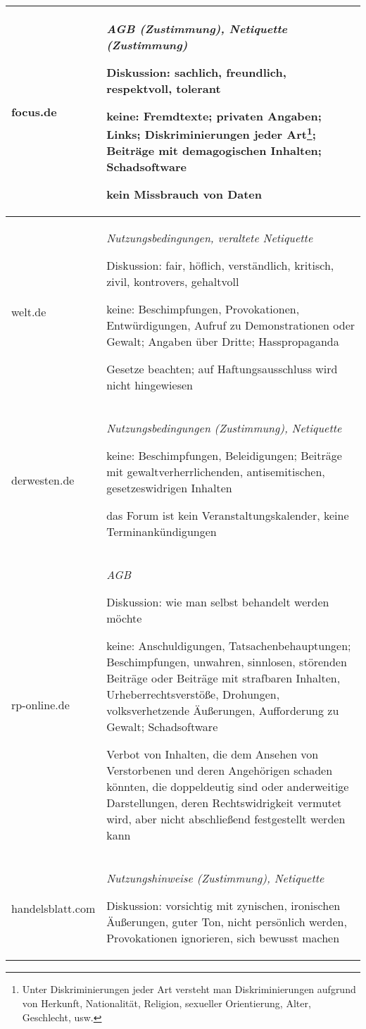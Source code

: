 \begin{landscape}
\begin{longtable}{lp{170mm}}
focus.de & \emph{AGB (Zustimmung), Netiquette (Zustimmung)}
	
	Diskussion: sachlich, freundlich, respektvoll, tolerant
	
	keine: Fremdtexte; privaten Angaben; Links; Diskriminierungen jeder Art\footnote{Unter Diskriminierungen jeder Art versteht man Diskriminierungen  
	aufgrund von Herkunft, Nationalität, Religion, sexueller Orientierung, Alter,
	Geschlecht, usw.}; Beiträge mit  demagogischen Inhalten; Schadsoftware
	
	kein Missbrauch von Daten
	\tabularnewline\midrule

welt.de & \emph{Nutzungsbedingungen, veraltete Netiquette}

	Diskussion: fair, höflich, verständlich, kritisch, zivil, kontrovers, gehaltvoll
		
	keine: Be\-schim\-pfung\-en, Pro\-vo\-ka\-tio\-nen, Ent\-wür\-di\-gung\-en, Auf\-ruf zu Demonstrationen oder Gewalt; Angaben über Dritte; 					Hasspropaganda 
	
	Gesetze beachten; auf Haftungsausschluss wird nicht hingewiesen\tabularnewline\midrule

derwesten.de & \emph{Nutzungsbedingungen (Zustimmung), Netiquette}

	keine: Beschimpfungen, Beleidigungen; Beiträge mit gewaltverherrlichenden, antisemitischen, gesetzeswidrigen Inhalten

	das Forum ist kein Ver\-an\-stal\-tungs\-ka\-len\-der, keine Ter\-min\-an\-kün\-di\-gun\-gen
	\tabularnewline\midrule


rp-online.de & \emph{AGB}

	Diskussion: wie man selbst behandelt werden möchte
	
	keine: Anschuldigungen, Tatsachenbehauptungen; Beschimpfungen, unwahren, sinnlosen, störenden Beiträge oder Beiträge mit strafbaren Inhalten, Urheberrechtsverstöße, Drohungen, volksverhetzende Äußerungen, Aufforderung zu Gewalt; Schadsoftware
	
	Verbot von Inhalten, die dem Ansehen von Verstorbenen und deren Angehörigen schaden könnten, die doppeldeutig
	sind oder anderweitige Darstellungen, deren Rechtswidrigkeit vermutet
	wird, aber nicht abschließend festgestellt werden kann
	\tabularnewline\midrule

handelsblatt.com & \emph{Nutzungshinweise (Zustimmung), Netiquette}

	Diskussion: vorsichtig mit zynischen, ironischen Äußerungen, guter Ton, nicht
	persönlich werden, Provokationen ignorieren, sich bewusst machen
	 

\end{longtable}
\end{landscape}
